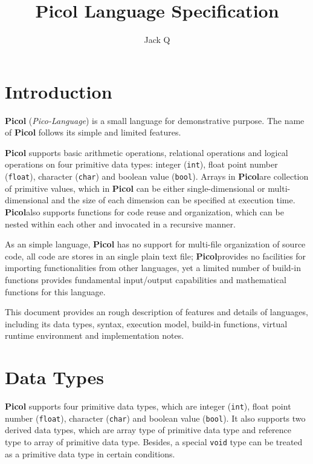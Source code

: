\documentclass[a4paper, 11.5pt]{article}
\title{Picol Language Specification}
\author{Jack Q}
\newcommand{\picol}[0]{{\bfseries Picol}}
\newcommand{\ci}[1]{\texttt{#1}}
\begin{document}
\maketitle

\begin{multicols}{2}

  \section{Introduction}
    \picol{} (\emph{Pico-Language}) is a small language for demonstrative purpose. 
    The name of \picol{} follows its simple and limited features.

    \picol{} supports basic arithmetic operations, relational operations and logical operations 
    on four primitive data types: integer (\ci{int}), float point number (\ci{float}), 
    character (\ci{char}) and boolean value (\ci{bool}). Arrays in \picol are collection of primitive values, 
    which in \picol{} can be either single-dimensional or multi-dimensional and the size of each 
    dimension can be specified at execution time. \picol also supports functions for code reuse and 
    organization, which can be nested within each other and invocated in a recursive manner.
    
    As an simple language, \picol{} has no support for multi-file organization of source code, 
    all code are stores in an single plain text file; \picol provides no facilities 
    for importing functionalities from other languages, yet a limited number of build-in functions 
    provides fundamental input/output capabilities and mathematical functions for this language.

    This document provides an rough description of features and details of languages,
    including its data types, syntax, execution model, build-in functions, 
    virtual runtime environment and implementation notes.

  \section{Data Types}
    \picol{} supports four primitive data types, which are integer (\ci{int}), float point number (\ci{float}), 
    character (\ci{char}) and boolean value (\ci{bool}). It also supports two derived data types,
    which are array type of primitive data type and reference type to array of primitive data type.
    Besides, a special \ci{void} type can be treated as a primitive data type in certain conditions.


\end{multicols}
\end{document}
